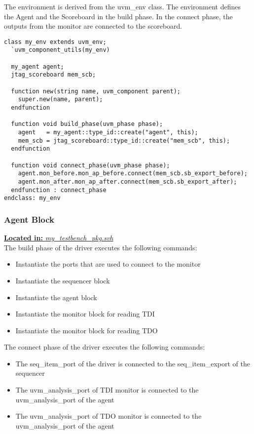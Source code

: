 \documentclass[a4paper,11pt]{article}
\begin{document}
The environment is derived from the uvm\_env class. The environment defines the Agent and the Scoreboard in the build phase. In the connect phase, the outputs from the monitor are connected to the scoreboard.

\begin{lstlisting}[style={verilog-style}, backgroundcolor=\color{lightgray}]
class my_env extends uvm_env;
  `uvm_component_utils(my_env)

  my_agent agent;
  jtag_scoreboard mem_scb;

  function new(string name, uvm_component parent);
    super.new(name, parent);
  endfunction
		
  function void build_phase(uvm_phase phase);
    agent   = my_agent::type_id::create("agent", this);
    mem_scb = jtag_scoreboard::type_id::create("mem_scb", this);
  endfunction

  function void connect_phase(uvm_phase phase);
    agent.mon_before.mon_ap_before.connect(mem_scb.sb_export_before);
    agent.mon_after.mon_ap_after.connect(mem_scb.sb_export_after);
  endfunction : connect_phase
endclass: my_env
\end{lstlisting}

\FloatBarrier
\subsubsection{Agent Block}

\underline{\textbf{Located in:} \textit{my\_testbench\_pkg.svh}}\\

The build phase of the driver executes the following commands:
\begin{itemize}[noitemsep]
\item Instantiate the ports that are used to connect to the monitor
\item Instantiate the sequencer block
\item Instantiate the agent block
\item Instantiate the monitor block for reading TDI 
\item Instantiate the monitor block for reading TDO
\end{itemize}

The connect phase of the driver executes the following commands:
\begin{itemize}[noitemsep]
\item The seq\_item\_port of the driver is connected to the seq\_item\_export of the sequencer
\item The uvm\_analysis\_port of TDI monitor is connected to the uvm\_analysis\_port of the agent
\item The uvm\_analysis\_port of TDO monitor is connected to the uvm\_analysis\_port of the agent
\end{itemize}
\end{document}
